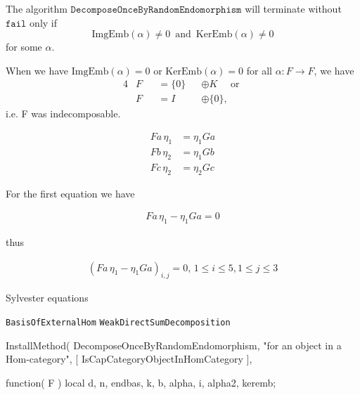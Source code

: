 The algorithm $\mathtt{DecomposeOnceByRandomEndomorphism}$ will terminate without $\mathtt{fail}$ only if
\[
\mathrm{ImgEmb}(\alpha) \neq 0\,\text{ and }\, \mathrm{KerEmb}(\alpha) \neq 0
\]
for some $\alpha$.

When we have $\mathrm{ImgEmb}(\alpha) = 0$ or $\mathrm{KerEmb}(\alpha) = 0$ for all $\alpha : F \rightarrow F$, we have
\begin{alignat}{4}
&F &&= \{0\} &&\oplus K\quad\text{ or }\\
&F &&= I &&\oplus \{0\},
\end{alignat}
i.e. F was indecomposable.




\begin{align}
Fa\,\eta_{1} &= \eta_{1} Ga \\
Fb\,\eta_{2} &= \eta_{1} Gb \\
Fc\,\eta_{2} &= \eta_{2} Gc
\end{align}

For the first equation we have

\begin{align}
Fa\,\eta_{1} - \eta_{1} Ga = 0
\end{align}

thus

\begin{align}
\left( Fa\,\eta_{1} - \eta_{1} Ga \right)_{i,j} = 0,\, 1\leq i \leq 5, 1\leq j \leq 3
\end{align}

Sylvester equations

\texttt{BasisOfExternalHom}
\texttt{WeakDirectSumDecomposition}

InstallMethod( DecomposeOnceByRandomEndomorphism,
        "for an object in a Hom-category",
        [ IsCapCategoryObjectInHomCategory ],
        
  function( F )
    local d, n, endbas, k, b, alpha, i, alpha2, keremb;
    
